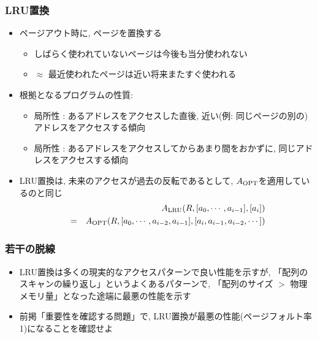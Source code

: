 \documentclass[12pt,dvipdfmx]{beamer}
\begin{document}
\begin{frame}
  \frametitle{LRU置換}
  \begin{itemize}
  \item ページアウト時に,
    ページを置換する
    \begin{itemize}
    \item しばらく使われていないページは今後も当分使われない
    \item $\approx$
      最近使われたページは近い将来またすぐ使われる
    \end{itemize}
  \item 根拠となるプログラムの性質: 
    \begin{itemize}
    \item {}局所性 : あるアドレスをアクセスした直後,
      近い(例: 同じページの別の)アドレスをアクセスする傾向
    \item {}局所性 : あるアドレスをアクセスしてからあまり間をおかずに,
      同じアドレスをアクセスする傾向
    \end{itemize}
  \item LRU置換は,
    未来のアクセスが過去の反転であるとして, $A_{\mbox{\scriptsize OPT}}$を適用しているのと同じ
    \begin{eqnarray*}
      &  & A_{\mbox{\scriptsize LRU}}(R, [a_0, \cdots , a_{i-1}], [a_i]) \\
      & = & A_{\mbox{\scriptsize OPT}}(R, [a_0, \cdots , a_{i-2}, a_{i-1}], [a_i, a_{i-1}, a_{i-2}, \cdots])
    \end{eqnarray*}
  \end{itemize}
\end{frame}

\begin{frame}
  \frametitle{若干の脱線}
  \begin{itemize}
  \item LRU置換は多くの現実的なアクセスパターンで良い性能を示すが,
    「配列のスキャンの繰り返し」というよくあるパターンで,
    「配列のサイズ $>$ 物理メモリ量」となった途端に最悪の性能を示す
  \item 前掲「重要性を確認する問題」で,
    LRU置換が最悪の性能(ページフォルト率1)になることを確認せよ
    \begin{center}
    \end{center}
  \end{itemize}
\end{frame}
\end{document}

